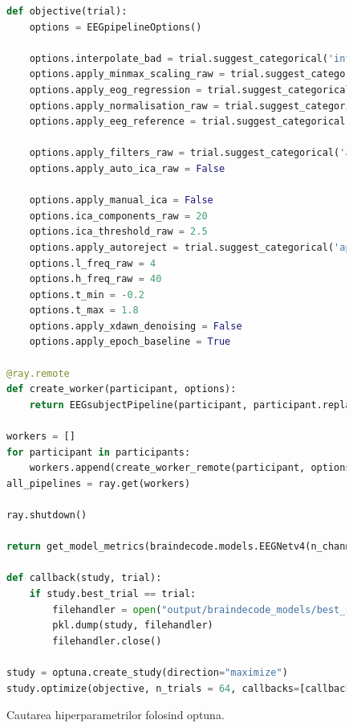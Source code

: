\begin{figure}
\begin{lstlisting}[language=Python]
def objective(trial):
    options = EEGpipelineOptions()

    options.interpolate_bad = trial.suggest_categorical('interpolate_bad', [False, True])
    options.apply_minmax_scaling_raw = trial.suggest_categorical('apply_minmax_scaling_raw', [False, True])
    options.apply_eog_regression = trial.suggest_categorical('apply_eog_regression', [False, True])
    options.apply_normalisation_raw = trial.suggest_categorical('apply_normalisation_raw', [False, True])
    options.apply_eeg_reference = trial.suggest_categorical('apply_eeg_reference', [False, True])

    options.apply_filters_raw = trial.suggest_categorical('apply_filters_raw', [False, True])
    options.apply_auto_ica_raw = False

    options.apply_manual_ica = False
    options.ica_components_raw = 20
    options.ica_threshold_raw = 2.5
    options.apply_autoreject = trial.suggest_categorical('apply_autoreject', [False, True])
    options.l_freq_raw = 4
    options.h_freq_raw = 40
    options.t_min = -0.2
    options.t_max = 1.8
    options.apply_xdawn_denoising = False
    options.apply_epoch_baseline = True

@ray.remote
def create_worker(participant, options):
    return EEGsubjectPipeline(participant, participant.replace("raw.csv", "quizz.xlsx"), "dsi-24.elc", options)

workers = []
for participant in participants:
    workers.append(create_worker_remote(participant, options))
all_pipelines = ray.get(workers)

ray.shutdown()

return get_model_metrics(braindecode.models.EEGNetv4(n_channels=n_chans, n_outputs=3, sfreq=300, n_times=601), all_pipelines)[1]

def callback(study, trial):
    if study.best_trial == trial:
        filehandler = open("output/braindecode_models/best_study.obj", "wb")
        pkl.dump(study, filehandler)
        filehandler.close()

study = optuna.create_study(direction="maximize")
study.optimize(objective, n_trials = 64, callbacks=[callback])
\end{lstlisting}
\caption{Cautarea hiperparametrilor folosind optuna.}
\label{fig:optuna_search}
\end{figure}

